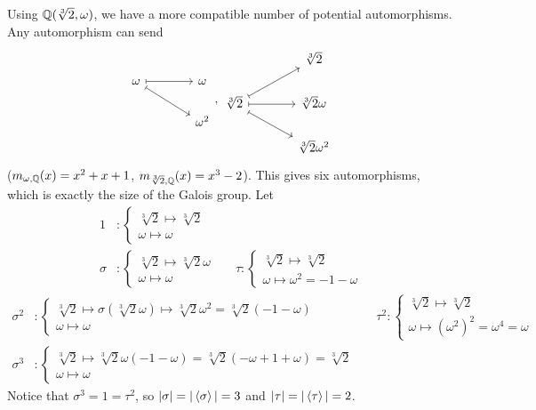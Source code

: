 \begin{example}
    Using $\mathbb{Q}(\sqrt[3]{2}, \omega)$, we have a more compatible number of potential automorphisms. Any automorphism can send
        \[
        \begin{tikzcd}[column sep=large]
            \omega \arrow[r, mapsto] \arrow[rd, mapsto] & \omega \\
             & \omega^2
        \end{tikzcd}, 
        \begin{tikzcd}[column sep=large]
             & \sqrt[3]{2} \\
            \sqrt[3]{2} \arrow[ru, mapsto] \arrow[r, mapsto] \arrow[rd, mapsto] & \sqrt[3]{2} \omega \\
            & \sqrt[3]{2} \omega^2
        \end{tikzcd}
    \]
    ($m_{\omega, \mathbb{Q}}(x) = x^2 + x + 1$, $m_{\sqrt[3]{2}, \mathbb{Q}}(x) = x^3-2$).
    This gives six automorphisms, which is exactly the size of the Galois group. Let
    \begin{align*}
        1 &: \begin{cases*}
            \sqrt[3]{2} \mapsto \sqrt[3]{2} \\
            \omega \mapsto \omega
        \end{cases*} \\
        \sigma &: \begin{cases*}
            \sqrt[3]{2} \mapsto \sqrt[3]{2}\omega \\
            \omega \mapsto \omega
        \end{cases*} &&
        \tau: \begin{cases*}
            \sqrt[3]{2} \mapsto \sqrt[3]{2} \\
            \omega \mapsto \omega^2 = -1-\omega
        \end{cases*}
    \end{align*}
    \begin{align*}
                \sigma^2 &: \begin{cases*}
            \sqrt[3]{2} \mapsto \sigma(\sqrt[3]{2}\omega) \mapsto \sqrt[3]{2}\omega^2 = \sqrt[3]{2}(-1-\omega) \\
            \omega \mapsto \omega
        \end{cases*} &&
        \tau^2: \begin{cases*}
            \sqrt[3]{2} \mapsto \sqrt[3]{2} \\
            \omega \mapsto \left(\omega^2\right)^2 = \omega^4 = \omega
        \end{cases*} \\
        \sigma^3 &: \begin{cases*}
            \sqrt[3]{2} \mapsto \sqrt[3]{2}\omega(-1-\omega) = \sqrt[3]{2}(-\omega + 1 + \omega) = \sqrt[3]{2} \\
            \omega \mapsto \omega
        \end{cases*}
    \end{align*}
    Notice that $\sigma^3 = 1 = \tau^2$, so $|\sigma| = |\left\langle \sigma \right\rangle| = 3$ and $|\tau| = |\left\langle \tau \right\rangle| = 2$.


\end{example}
